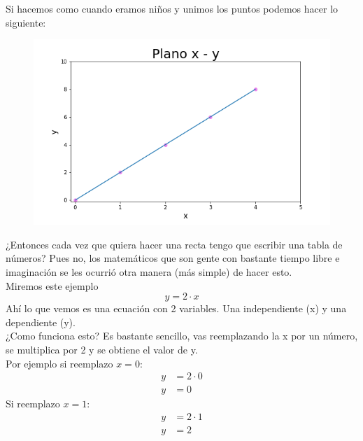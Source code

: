 \documentclass{article}
\begin{document}
\newpage
Si hacemos como cuando eramos niños y unimos los puntos podemos hacer lo siguiente:\\
\begin{figure}[h!]
\includegraphics[scale=0.5]{Imagenes/recta_de_prueba.png}
\centering
\end{figure}
\newline
¿Entonces cada vez que quiera hacer una recta tengo que escribir una tabla de números? Pues no, los matemáticos que son gente con bastante tiempo libre e imaginación se les ocurrió otra manera (más simple) de hacer esto.\\
Miremos este ejemplo\\
\begin{equation*}
    y= 2 \cdot x
\end{equation*}
Ahí lo que vemos es una ecuación con 2 variables. Una independiente (x) y una dependiente (y).\\
¿Como funciona esto? Es bastante sencillo, vas reemplazando la x por un número, se multiplica por 2 y se obtiene el valor de y.\\
 Por ejemplo si reemplazo $x=0$:
\begin{equation*}
    \begin{split}
        y &=2\cdot 0\\
        y &=0
    \end{split}
\end{equation*}
Si reemplazo $x=1$:
\begin{equation*}
    \begin{split}
        y &=2\cdot 1\\
        y &=2
    \end{split}
\end{equation*}
\end{document}
